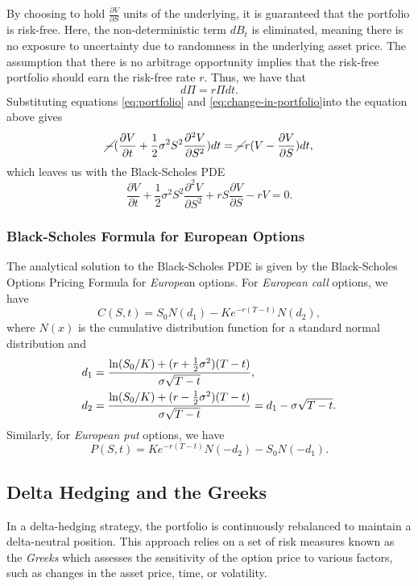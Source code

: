 By choosing to hold $\frac{\partial V}{\partial S}$ units of the underlying, it is guaranteed that the portfolio is risk-free. Here, the non-deterministic term $dB_t$ is eliminated, meaning there is no
exposure to uncertainty due to randomness in the underlying asset price. The assumption that there is no arbitrage opportunity implies that the risk-free portfolio should earn the risk-free rate $r$. Thus, we have that
\begin{equation}
    d\Pi = r \Pi dt.
\end{equation}
Substituting equations \eqref{eq:portfolio} and \eqref{eq:change-in-portfolio}into the equation above gives
\begin{equation}
    \cancel{-}(\frac{\partial V}{\partial t} + \frac{1}{2} \sigma^2 S^2 \frac{\partial^2 V}{\partial S^2}) dt = \cancel{-}r (V - \frac{\partial V}{\partial S}) dt,
\end{equation}
which leaves us with the Black-Scholes PDE
\begin{equation}
    \frac{\partial V}{\partial t} + \frac{1}{2} \sigma^2 S^2 \frac{\partial^2 V}{\partial S^2} + rS \frac{\partial V}{\partial S} - rV = 0. \label{eq:black-scholes-pde}
\end{equation}

\subsubsection{Black-Scholes Formula for European Options} 
The analytical solution to the Black-Scholes PDE is given by the Black-Scholes Options Pricing Formula for \textit{Europea}n options. For \textit{European call} options, we have
\begin{equation}
    C(S,t) = S_0 N(d_1) - K e^{-r(T-t)} N(d_2),
\end{equation}
where $N(x)$ is the cumulative distribution function for a standard normal distribution and
\begin{align}
    d_1 {}={}& \frac{\ln (S_0 / K) + (r + \frac{1}{2}\sigma^2)(T-t)}{\sigma \sqrt{T-t}}, \notag \\
    d_2 {}={}& \frac{\ln (S_0 / K) + (r - \frac{1}{2}\sigma^2)(T-t)}{\sigma \sqrt{T-t}} = d_1 - \sigma \sqrt{T-t}. \notag
\end{align}
Similarly, for \textit{European put} options, we have
\begin{equation}
   P(S,t) = Ke^{-r(T-t)}N(-d_2) - S_0 N(-d_1).
\end{equation}


\subsection{Delta Hedging and the Greeks}
In a delta-hedging strategy, the portfolio is continuously rebalanced to maintain a delta-neutral position. This approach relies on a set of risk measures known as 
the \textit{Greeks} which assesses the sensitivity of the option price to various factors, such as changes in the asset price, time, or volatility. 

